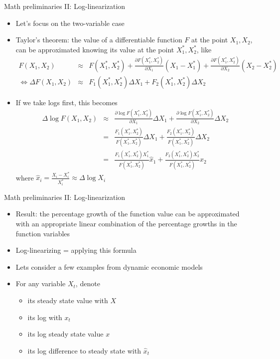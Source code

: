 \documentclass[9pt,xcolor={dvipsnames}]{beamer}
\newcommand{\bit}{\begin{itemize}}
\newcommand{\eit}{\end{itemize}}
\newcommand{\bc}{\color{blue}}
\begin{document}
\begin{frame}{Math preliminaries II: Log-linearization}

\bit
\setlength\itemsep{1.5em}

\item Let's focus on the two-variable case

\item Taylor's theorem: the value of a differentiable function $F$ at the point ${X_1, X_2}$, can be approximated knowing its value at the point $X^*_1, X^*_2$, like
\begin{eqnarray}
F(X_1, X_2) &\approx& F(X^*_1, X^*_2) +\frac{\partial F(X^*_1, X^*_2)}{\partial X_1}(X_1-X_1^*)+\frac{\partial F(X^*_1, X^*_2)}{\partial X_2}(X_2-X_2^*) \nonumber \\
\Leftrightarrow \Delta F(X_1, X_2) &\approx& F_1(X^*_1, X^*_2)\Delta X_1+F_2(X^*_1, X^*_2)\Delta X_2 \nonumber 
\end{eqnarray}

\item If we take logs first, this becomes
\begin{eqnarray}
\Delta \log F(X_1, X_2) &\approx& \frac{\partial \log F(X^*_1, X^*_2)}{\partial X_1}\Delta X_1  +\frac{\partial \log F(X^*_1, X^*_2)}{\partial X_2}\Delta X_2 \nonumber \\
&=& \frac{F_1(X^*_1, X^*_2)}{F(X^*_1, X^*_2)}\Delta X_1   +\frac{F_2(X^*_1, X^*_2)}{F(X^*_1, X^*_2)}\Delta X_2  \nonumber \\
&=& \frac{F_1(X^*_1, X^*_2)X^*_1}{F(X^*_1, X^*_2)}\hat x_1   +\frac{F_2(X^*_1, X^*_2)X^*_2}{F(X^*_1, X^*_2)}\hat x_2  \nonumber 
\end{eqnarray}
where $\hat x_i= \frac{X_i-X_i^*}{X_i^*} \approx \Delta \log X_i$
\eit

\end{frame}


\begin{frame}{Math preliminaries II: Log-linearization}

\bit
\setlength\itemsep{2em}

\item Result: the percentage growth of the function value can be approximated with an appropriate linear combination of the percentage growths in the function variables

\item {\bc Log-linearizing} = applying this formula

\item Lets consider a few examples from dynamic economic models

\item For any variable $X_t$,  denote
\bit
\setlength\itemsep{0.5em}
\item its steady state value with $X$

\item its log with $x_t$

\item its log steady state value $x$

\item its log difference to steady state with $\hat x_t$
\eit


\eit

\end{frame}
\end{document}
